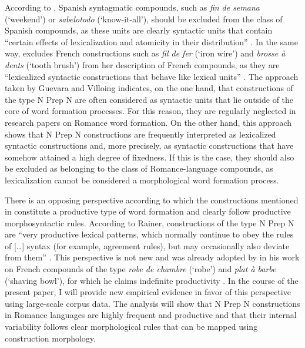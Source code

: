 \documentclass[output=paper]{langsci/langscibook}
\begin{document}
According to \citet{Guevara:2012}, Spanish syntagmatic compounds, such as \textit{fin de semana} (`weekend') or \textit{sabelotodo} (`know-it-all'), should be excluded from the class of Spanish compounds, as these units are clearly syntactic units that contain “certain effects of lexicalization and atomicity in their distribution” \citep[180]{Guevara:2012}. In the same way, \citet{Villoing:2012} excludes French constructions such as \textit{fil de fer} (`iron wire') and \textit{brosse à dents} (`tooth brush') from her description of French compounds, as they are “lexicalized syntactic constructions that behave like lexical units” \citep[35]{Villoing:2012}. The approach taken by Guevara and Villoing indicates, on the one hand, that constructions of the type N Prep N are often considered as syntactic units that lie outside of the core of word formation processes. For this reason, they are regularly neglected in research papers on Romance word formation. On the other hand, this approach shows that N Prep N constructions are frequently interpreted as lexicalized syntactic constructions and, more precisely, as syntactic constructions that have somehow attained a high degree of fixedness. If this is the case, they should also be excluded as belonging to the class of Romance-language compounds, as lexicalization cannot be considered a morphological word formation process.

There is an opposing perspective according to which the constructions mentioned in  constitute a productive type of word formation and clearly follow productive morphosyntactic rules. According to Rainer, constructions of the type N Prep N are “very productive lexical patterns, which normally continue to obey the rules of […] syntax (for example, agreement rules), but may occasionally also deviate from them” \citep[2724]{Rainer:2016}. This perspective is not new and was already adopted by \citet{Benveniste:1974} in his work on French compounds of the type \textit {robe de chambre} (`robe') and \textit {plat à barbe} (`shaving bowl'), for which he claims indefinite productivity \citep[172]{Benveniste:1974}. In the course of the present paper, I will provide new empirical evidence in favor of this perspective using large-scale corpus data. The analysis will show that N Prep N constructions in Romance languages are highly frequent and productive and that their internal variability follows clear morphological rules that can be mapped using construction morphology.
\end{document}
